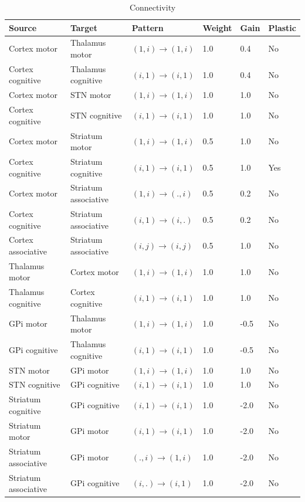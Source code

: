 \begin{table}[htbp]
  \small \sffamily \centering
  \begin{tabular}{llllll}
\bf Source & \bf Target & \bf Pattern & \bf Weight & \bf Gain & \bf Plastic\\
\hline
Cortex motor & Thalamus motor & \((1,i) \rightarrow (1,i)\) & 1.0 & 0.4 & No\\
Cortex cognitive & Thalamus cognitive & \((i,1) \rightarrow (i,1)\) & 1.0 & 0.4 & No\\
Cortex motor & STN motor & \((1,i) \rightarrow (1,i)\) & 1.0 & 1.0 & No\\
Cortex cognitive & STN cognitive & \((i,1) \rightarrow (i,1)\) & 1.0 & 1.0 & No\\
Cortex motor & Striatum motor & \((1,i) \rightarrow (1,i)\) & 0.5 & 1.0 & No\\
Cortex cognitive & Striatum cognitive & \((i,1) \rightarrow (i,1)\) & 0.5 & 1.0 & Yes\\
Cortex motor & Striatum associative & \((1,i) \rightarrow (.,i)\) & 0.5 & 0.2 & No\\
Cortex cognitive & Striatum associative & \((i,1) \rightarrow (i,.)\) & 0.5 & 0.2 & No\\
Cortex associative & Striatum associative & \((i,j) \rightarrow (i,j)\) & 0.5 & 1.0 & No\\
Thalamus motor & Cortex motor & \((1,i) \rightarrow (1,i)\) & 1.0 & 1.0 & No\\
Thalamus cognitive & Cortex cognitive & \((i,1) \rightarrow (i,1)\) & 1.0 & 1.0 & No\\
GPi motor & Thalamus motor & \((1,i) \rightarrow (1,i)\) & 1.0 & -0.5 & No\\
GPi cognitive & Thalamus cognitive & \((i,1) \rightarrow (i,1)\) & 1.0 & -0.5 & No\\
STN motor & GPi motor & \((1,i) \rightarrow (1,i)\) & 1.0 & 1.0 & No\\
STN cognitive & GPi cognitive & \((i,1) \rightarrow (i,1)\) & 1.0 & 1.0 & No\\
Striatum cognitive & GPi cognitive & \((i,1) \rightarrow (i,1)\) & 1.0 & -2.0 & No\\
Striatum motor & GPi motor & \((i,1) \rightarrow (i,1)\) & 1.0 & -2.0 & No\\
Striatum associative & GPi motor & \((.,i) \rightarrow (1,i)\) & 1.0 & -2.0 & No\\
Striatum associative & GPi cognitive & \((i,.) \rightarrow (i,1)\) & 1.0 & -2.0 & No\\
\hline
\end{tabular}
\caption{Connectivity}
\end{table}





